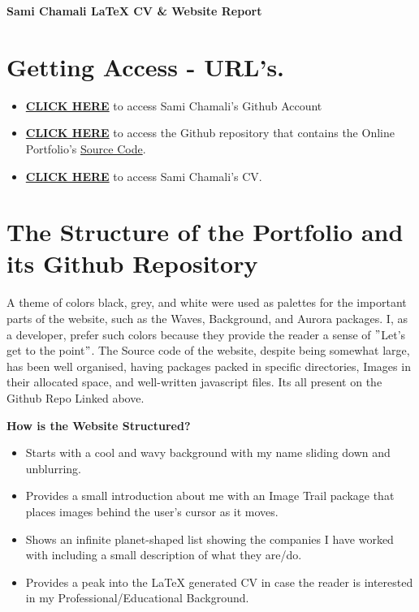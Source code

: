 \documentclass[12pt, letterpaper]{article}
\begin{document}
    \begin{center}
    \textbf{Sami Chamali LaTeX CV \& Website Report}


    \end{center}
\section{Getting Access - URL's.}
    \begin{itemize}
        \item \textbf{\href{https://github.com/samichamali}{CLICK HERE}} to access Sami Chamali's Github Account
        \item \textbf{\href{https://github.com/samichamali/portfolio}{CLICK HERE}} to access the Github repository that contains the Online Portfolio's \underline{Source Code}.
        \item \textbf{\href{https://samichamali.github.io/portfolio/Images/CV.pdf}{CLICK HERE}} to access Sami Chamali's CV.
    \end{itemize}

\section{The Structure of the Portfolio and its Github Repository}
    A theme of colors black, grey, and white were used as palettes for the important parts of the website, such as the Waves, Background, and Aurora packages. I, as a developer, prefer such colors because they provide the reader a sense of \("\)Let's get to the point\("\).
    The Source code of the website, despite being somewhat large, has been well organised, having packages packed in specific directories, Images in their allocated space, and well-written javascript files. Its all present on the Github Repo Linked above.
    \par \textbf{How is the Website Structured?}
    \begin{itemize}
        \item Starts with a cool and wavy background with my name sliding down and unblurring.
        \item Provides a small introduction about me with an Image Trail package that places images behind the user's cursor as it moves.
        \item Shows an infinite planet-shaped list showing the companies I have worked with including a small description of what they are/do.
        \item Provides a peak into the LaTeX generated CV in case the reader is interested in my Professional/Educational Background.
    \end{itemize}
\end{document}
